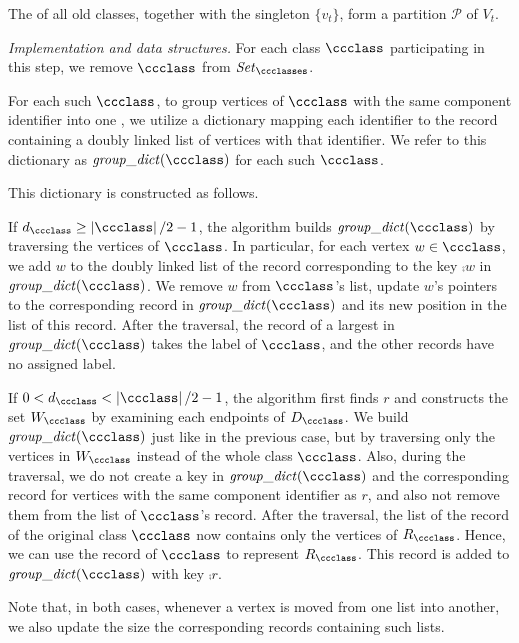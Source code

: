 The  of all old classes, together with the singleton $ \{v_t\} $, form a partition $ \mathcal P $ of $ V_t $. 

\textit{Implementation and data structures.}
For each class $ \ccclass $ participating in this step, we remove $ \ccclass $ from $ \setClasses $.

For each such $ \ccclass $, to group vertices of $ \ccclass $ with the same component identifier into one \piece{}, we utilize a dictionary mapping each identifier to the record containing a doubly linked list of vertices with that identifier.
We refer to this dictionary as $ \groupdict(\ccclass) $ for each such $ \ccclass $.

This dictionary is constructed as follows.

If $ d_{\ccclass}\ge\card{\ccclass}/2-1 $, the algorithm builds $ \groupdict(\ccclass) $ by traversing the vertices of $ \ccclass $.
In particular, for each vertex $ w\in \ccclass $, we add $ w $ to the doubly linked list of the record corresponding to the key $ \comp{w} $ in $ \groupdict(\ccclass) $.
We remove $ w $ from $ \ccclass $'s list, update $ w $'s pointers to the corresponding record in $ \groupdict(\ccclass) $ and its new position in the list of this record.
After the traversal, the record of a largest \piece{} in $ \groupdict(\ccclass) $ takes the label of $ \ccclass $, and the other records have no assigned label.

If $ 0<d_{\ccclass}<\card{\ccclass}/2-1 $, the algorithm first finds $ r $ and constructs the set $ W_{\ccclass} $ by examining each endpoints of $ D_{\ccclass} $.
We build $ \groupdict(\ccclass) $ just like in the previous case, but by traversing only the vertices in $ W_{\ccclass} $ instead of the whole class $ \ccclass $.
Also, during the traversal, we do not create a key in $ \groupdict(\ccclass) $ and the corresponding record for vertices with the same component identifier as $ r $, and also not remove them from the list of $ \ccclass $'s record.
After the traversal, the list of the record of the original class $ \ccclass $ now contains only the vertices of $ \retainedPiece{\ccclass} $.
Hence, we can use the record of $ \ccclass $ to represent $ \retainedPiece{\ccclass} $.
This record is added to $ \groupdict(\ccclass) $ with key $ \comp{r} $.

Note that, in both cases, whenever a vertex is moved from one list into another, we also update the size the corresponding records containing such lists.


